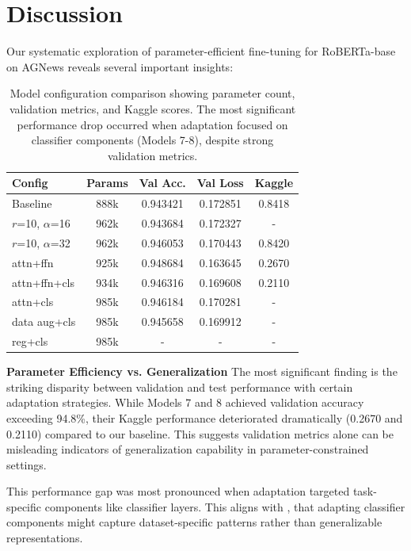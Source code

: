\documentclass[letterpaper]{article}
\begin{document}
\section{Discussion}
Our systematic exploration of parameter-efficient fine-tuning for RoBERTa-base on AGNews reveals several important insights:
\begin{table}[htbp]
    \centering
    \small
    \begin{tabular}{l|c|c|c|c}
         \textbf{Config} & \textbf{Params} & \textbf{Val Acc.} & \textbf{Val Loss} & \textbf{Kaggle} \\
         \hline
         Baseline & 888k & 0.943421 & 0.172851 & 0.8418 \\
         \hline
         $r$=10, $\alpha$=16 & 962k & 0.943684 & 0.172327 & - \\
         $r$=10, $\alpha$=32 & 962k & 0.946053 & 0.170443 & 0.8420 \\
         \hline
         attn+ffn& 925k & 0.948684 & 0.163645 & 0.2670 \\
         attn+ffn+cls& 934k & 0.946316 & 0.169608 & 0.2110 \\
         attn+cls& 985k & 0.946184 & 0.170281 & - \\
         \hline
         data aug+cls & 985k & 0.945658 & 0.169912 & - \\
         reg+cls & 985k & - & - & - \\
    \end{tabular}
    \caption{Model configuration comparison showing parameter count, validation metrics, and Kaggle scores. The most significant performance drop occurred when adaptation focused on classifier components (Models 7-8), despite strong validation metrics.}
    \label{tab:model_comparison}
\end{table}

\textbf{Parameter Efficiency vs. Generalization}
The most significant finding is the striking disparity between validation and test performance with certain adaptation strategies. While Models 7 and 8 achieved validation accuracy exceeding 94.8\%, their Kaggle performance deteriorated dramatically (0.2670 and 0.2110) compared to our baseline. This suggests validation metrics alone can be misleading indicators of generalization capability in parameter-constrained settings.

This performance gap was most pronounced when adaptation targeted task-specific components like classifier layers. This aligns with \cite{hu2022lora}, that adapting classifier components might capture dataset-specific patterns rather than generalizable representations.
\end{document}
